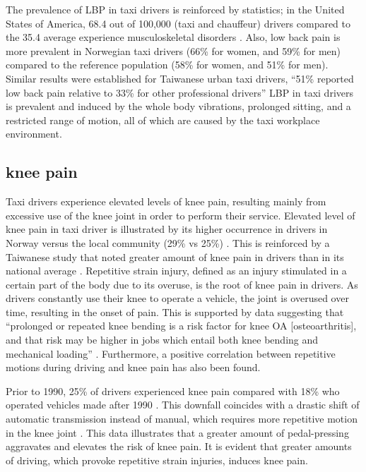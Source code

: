\documentclass[11pt]{article}
\begin{document}
The prevalence of LBP in taxi drivers is reinforced by statistics; in the
United States of America, 68.4 out of 100,000 (taxi and chauffeur)
drivers compared to the 35.4 average experience musculoskeletal
disorders \cite{68}. Also, low back pain is more prevalent in
Norwegian taxi drivers (66\% for women, and 59\% for men) compared to
the reference population (58\% for women, and 51\% for men). Similar
results were established for Taiwanese urban taxi drivers, “51\%
reported low back pain relative to 33\% for other professional
drivers” \cite{Question?} LBP in taxi drivers is prevalent and induced
by the whole body vibrations, prolonged sitting, and a restricted
range of motion, all of which are caused by the taxi workplace
environment.
 
\subsection{knee pain}
Taxi drivers experience elevated levels of knee pain, resulting mainly
from excessive use of the knee joint in order to perform their
service. Elevated level of knee pain in taxi driver is illustrated by
its higher occurrence in drivers in Norway versus the local community
(29\% vs 25\%) \cite{KneePain}. This is reinforced by a Taiwanese
study that noted greater amount of knee pain in drivers than in its
national average \cite{KneePain}. Repetitive strain injury, defined as
an injury stimulated in a certain part of the body due to its overuse,
is the root of knee pain in drivers\cite{RSI}. As drivers constantly
use their knee to operate a vehicle, the joint is overused over time,
resulting in the onset of pain. This is supported by data suggesting
that “prolonged or repeated knee bending is a risk factor for knee OA
[osteoarthritis], and that risk may be higher in jobs which entail
both knee bending and mechanical loading”
\cite{Osteoarthritis}. Furthermore, a positive correlation between
repetitive motions during driving and knee pain has also been
found. 

Prior to 1990, 25\% of drivers experienced knee pain compared
with 18\% who operated vehicles made after 1990 \cite{KneePain}. This
downfall coincides with a drastic shift of automatic transmission
instead of manual, which requires more repetitive motion in the knee
joint \cite{KneePain}. This data illustrates that a greater amount of
pedal-pressing aggravates and elevates the risk of knee pain. It is
evident that greater amounts of driving, which provoke repetitive
strain injuries, induces knee pain.
\end{document}
